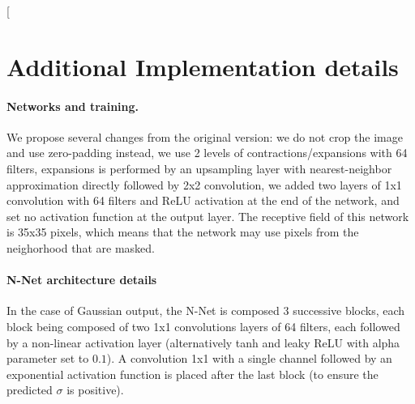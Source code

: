 \documentclass{article}
\begin{document}
\twocolumn[


\begin{icmlauthorlist}
\end{icmlauthorlist}




\vskip 0.3in


\section{Additional Implementation details}
\label{si:implementation}
\paragraph{Networks and training.}
We propose several changes from the original version: we do not crop the image and use zero-padding instead, we use 2 levels of contractions/expansions with 64 filters, expansions is performed by an upsampling layer with nearest-neighbor approximation directly followed by 2x2 convolution, we added two layers of 1x1 convolution with 64 filters and ReLU activation at the end of the network, and set no activation function at the output layer.
The receptive field of this network is 35x35 pixels, which means that the network may use pixels from the neighorhood that are masked.

\paragraph{N-Net architecture details}
In the case of Gaussian output, the N-Net is composed 3 successive blocks, each block being composed of two 1x1 convolutions layers of 64 filters, each followed by a non-linear activation layer (alternatively tanh and leaky ReLU with alpha parameter set to $0.1$). A convolution 1x1 with a single channel followed by an exponential activation function is placed after the last block (to ensure the predicted $\sigma$ is positive).
\end{document}
